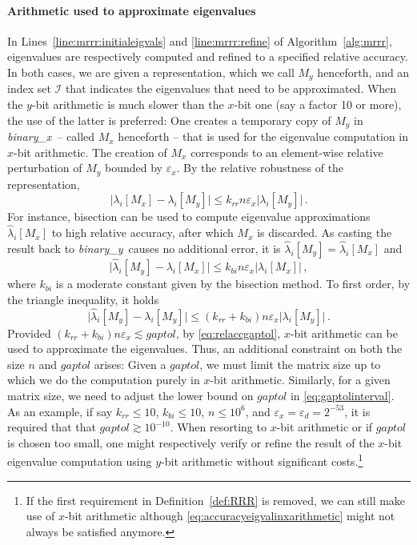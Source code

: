 \documentclass[final]{siamltex}
\newcommand\abs[1]{\lvert#1\rvert}
\newcommand{\binaryx}{{\it binary\_\hspace*{1pt}x}}
\newcommand{\binaryy}{{\it binary\_\hspace*{0pt}y}}
\begin{document}
\paragraph{Arithmetic used to approximate eigenvalues} 
In Lines~\ref{line:mrrr:initialeigvals} and \ref{line:mrrr:refine} of
Algorithm~\ref{alg:mrrr}, eigenvalues are respectively computed and refined
to a specified relative accuracy. 
In both cases, we are given a
representation, which we call $M_y$ henceforth, and an index set
$\mathcal{I}$ that indicates the eigenvalues that need to be approximated. 
When the $y$-bit arithmetic is much slower than the $x$-bit one (say a
factor 10 or more), the use of the latter is preferred: 
One creates a temporary copy of $M_y$ in \binaryx\ -- called $M_x$ henceforth
-- that is used for the eigenvalue computation in $x$-bit arithmetic. The creation of $M_x$
corresponds to an element-wise relative perturbation of $M_y$ bounded by
$\varepsilon_x$. By the relative robustness of the representation, 
\begin{equation}
\abs{\lambda_i[M_x] - \lambda_i[M_y]} \leq
k_{rr} n \varepsilon_x \abs{\lambda_i[M_y]} \,.
\end{equation}
For instance, bisection can be used to compute eigenvalue approximations
$\hat{\lambda}_i[M_x]$ to high relative accuracy, after which $M_x$ is discarded. As
casting the result back to \binaryy\ causes no additional error, it is $\hat{\lambda}_i[M_y] =
\hat{\lambda}_i[M_x]$ and
\begin{equation*}
\abs{\hat{\lambda}_i[M_y] - \lambda_i[M_x]} \leq
k_{bi} n \varepsilon_x \abs{\lambda_i[M_x]} \,,
\end{equation*}
where $k_{bi}$ is a moderate constant given by the bisection method. To first order, by the
triangle inequality, it holds
\begin{equation}
\abs{\hat{\lambda}_i[M_y] - \lambda_i[M_y]} \leq \left( k_{rr} + k_{bi}\right) n
\varepsilon_x \abs{\lambda_i[M_y]} \,.
\label{eq:accuracyeigvalinxarithmetic}
\end{equation}
Provided $\left( k_{rr} + k_{bi}\right) n \varepsilon_x \lesssim
gaptol$, by \eqref{eq:relaccgaptol}, $x$-bit arithmetic can be used to approximate the
eigenvalues. Thus, an additional constraint on both the size $n$ and
$gaptol$ arises:
Given a $gaptol$, we must limit the matrix size up to which we do the
computation purely in $x$-bit arithmetic. Similarly, for a given matrix size, we need to adjust
the lower bound on $gaptol$ in \eqref{eq:gaptolinterval}. As an example, if
say $k_{rr} \leq 10$, $k_{bi} \leq 10$, $n \leq 10^6$, and $\varepsilon_x =
\varepsilon_d = 2^{-53}$, it is required that that $gaptol \gtrsim 10^{-10}$. 
When resorting to $x$-bit arithmetic or if $gaptol$ is chosen too small, one might
respectively verify or refine the result of the $x$-bit eigenvalue computation using
$y$-bit arithmetic without significant costs.\footnote{If the first
  requirement in Definition~\ref{def:RRR} is 
  removed, we can still make use of $x$-bit arithmetic although
  \eqref{eq:accuracyeigvalinxarithmetic} might
  not always be satisfied anymore.} 
\end{document}
